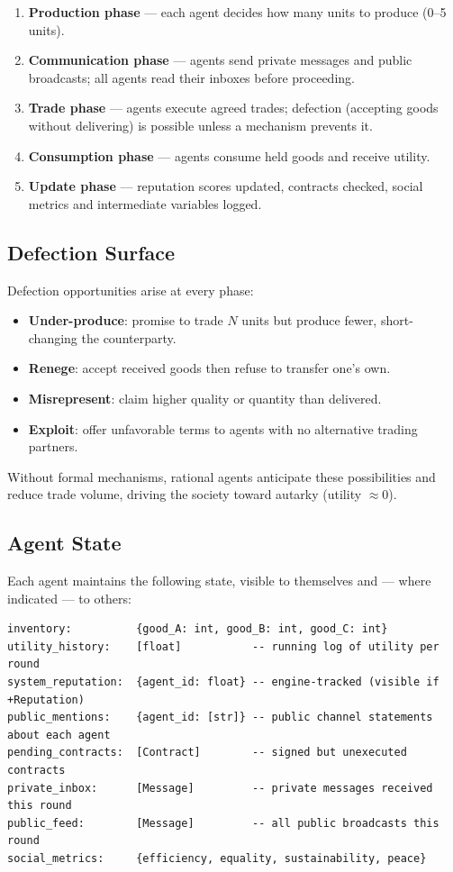 \documentclass[12pt, a4paper]{article}
\begin{document}
\begin{enumerate}
  \item \textbf{Production phase} — each agent decides how many units to produce (0–5 units).
  \item \textbf{Communication phase} — agents send private messages and public broadcasts; all agents read their inboxes before proceeding.
  \item \textbf{Trade phase} — agents execute agreed trades; defection (accepting goods without delivering) is possible unless a mechanism prevents it.
  \item \textbf{Consumption phase} — agents consume held goods and receive utility.
  \item \textbf{Update phase} — reputation scores updated, contracts checked, social metrics and intermediate variables logged.
\end{enumerate}

\subsection{Defection Surface}

Defection opportunities arise at every phase:

\begin{itemize}
  \item \textbf{Under-produce}: promise to trade $N$ units but produce fewer, short-changing the counterparty.
  \item \textbf{Renege}: accept received goods then refuse to transfer one's own.
  \item \textbf{Misrepresent}: claim higher quality or quantity than delivered.
  \item \textbf{Exploit}: offer unfavorable terms to agents with no alternative trading partners.
\end{itemize}

Without formal mechanisms, rational agents anticipate these possibilities and reduce trade volume, driving the society toward autarky (utility $\approx 0$).

\subsection{Agent State}

Each agent maintains the following state, visible to themselves and — where indicated — to others:

\begin{lstlisting}[basicstyle=\ttfamily\small, breaklines=true]
inventory:          {good_A: int, good_B: int, good_C: int}
utility_history:    [float]           -- running log of utility per round
system_reputation:  {agent_id: float} -- engine-tracked (visible if +Reputation)
public_mentions:    {agent_id: [str]} -- public channel statements about each agent
pending_contracts:  [Contract]        -- signed but unexecuted contracts
private_inbox:      [Message]         -- private messages received this round
public_feed:        [Message]         -- all public broadcasts this round
social_metrics:     {efficiency, equality, sustainability, peace}
\end{lstlisting}
\end{document}
